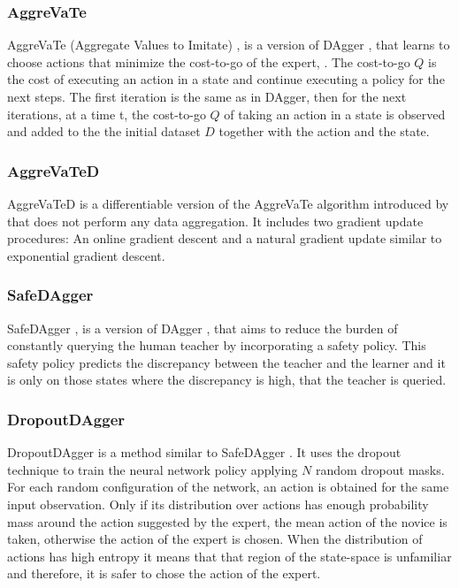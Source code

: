 \subsubsection*{AggreVaTe}
AggreVaTe (Aggregate Values to Imitate) \cite{AggreVaTe-Ross-Bagnell:2014}, is a version of DAgger \cite{DAgger-Ross:2011}, that learns to choose actions that minimize the cost-to-go of the expert, 
\cite{Global-overview-Attia:2018}. The cost-to-go $Q$ is the cost of executing an action in a state and continue executing a policy for the next steps. The first iteration is the same as in DAgger, then for the next iterations,  at a time t, the cost-to-go $Q$ of taking an action in a state is observed and added to the the initial dataset $D$ together with the action and the state.



\subsubsection*{AggreVaTeD}
AggreVaTeD \cite{AggreVaTeD-Sun:2017} is a differentiable version of the AggreVaTe algorithm introduced by \cite{AggreVaTe-Ross-Bagnell:2014} that does not perform any data aggregation. It includes two gradient update procedures: An online gradient descent and a natural gradient update similar to exponential gradient descent.

\subsubsection*{SafeDAgger}
SafeDAgger \cite{SafeDAgger-Zhang-Cho:2016}, is a version of DAgger \cite{DAgger-Ross:2011}, that aims to reduce the burden of constantly querying the human teacher by incorporating a safety policy. This safety policy predicts the discrepancy between the teacher and the learner and it is only on those states where the discrepancy is high, that the teacher is queried.


\subsubsection*{DropoutDAgger}
DropoutDAgger \cite{DropoutDAgger} is a method similar to SafeDAgger \cite{SafeDAgger-Zhang-Cho:2016}. It uses the dropout technique to train the neural network policy applying $N$ random dropout masks. For each random configuration of the network, an action is obtained for the same input observation. Only if its distribution over actions has enough probability mass around the action suggested by the expert, the mean action of the novice is taken, otherwise the action of the expert is chosen. When the distribution of actions has high entropy it means that that region of the state-space is unfamiliar and therefore, it is safer to chose the action of the expert.

